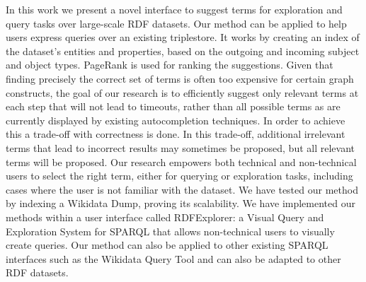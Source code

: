 \begin{intro}

In this work we present a novel interface to suggest terms for exploration and query tasks over large-scale RDF datasets. 
Our method can be applied to help users express queries over an existing triplestore. 
It works by creating an index of the dataset's entities and properties, based on the outgoing and incoming subject and object types.
PageRank is used for ranking the suggestions. 
Given that finding precisely the correct set of terms is often too expensive for certain graph constructs, the goal of our research is to efficiently suggest only relevant terms at each step that will not lead to timeouts, rather than all possible terms as are currently displayed by existing autocompletion techniques. 
In order to achieve this a trade-off with correctness is done. 
In this trade-off, additional irrelevant terms that lead to incorrect results may sometimes be proposed, but all relevant terms will be proposed.
Our research empowers both technical and non-technical users to select the right term, either for querying or exploration tasks, including cases where the user is not familiar with the dataset.
We have tested our method by indexing a Wikidata Dump, proving its scalability. 
We have implemented our methods within a user interface called RDFExplorer: a Visual Query and Exploration System for SPARQL that allows non-technical users to visually create queries. 
Our method can also be applied to other existing SPARQL interfaces such as the Wikidata Query Tool and can also be adapted to other RDF datasets.

\end{intro}